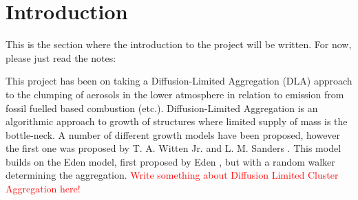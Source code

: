 \section{Introduction}

This is the section where the introduction to the project will be written. For now, please just read the notes: 

This project has been on taking a Diffusion-Limited Aggregation (DLA) approach to the clumping of aerosols in the lower atmosphere in relation to emission from fossil fuelled based combustion (etc.). Diffusion-Limited Aggregation is an algorithmic approach to growth of structures where limited supply of mass is the bottle-neck. A number of different growth models have been proposed, however the first one was proposed by T. A. Witten Jr. and L. M. Sanders \cite{PhysRevLett.47.1400}. This model builds on the Eden model, first proposed by Eden \cite{eden1961}, but with a random walker determining the aggregation.  \textcolor{red}{Write something about Diffusion Limited Cluster Aggregation here!}